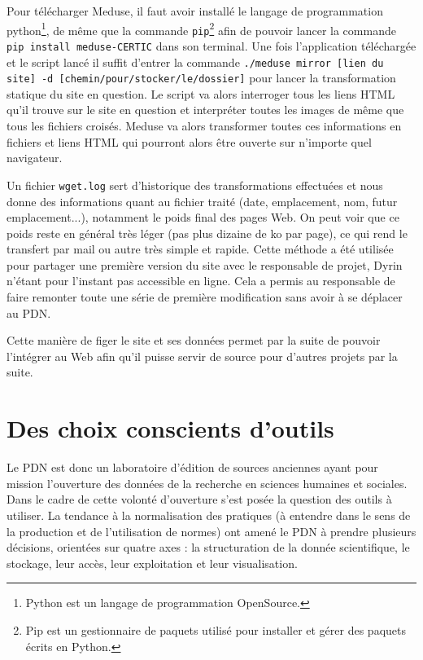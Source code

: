 \documentclass[a4paper,12pt,twoside]{book}
\begin{document}
Pour télécharger Meduse, il faut avoir installé le langage de programmation python\footnote{Python est un langage de programmation OpenSource.}, de même que la commande \texttt{pip}\footnote{Pip est un gestionnaire de paquets utilisé pour installer et gérer des paquets écrits en Python.} afin de pouvoir lancer la commande \texttt{pip install meduse-CERTIC} dans son terminal. Une fois l'application téléchargée et le script lancé il suffit d'entrer la commande \texttt{./meduse mirror [lien du site] -d [chemin/pour/stocker/le/dossier]}  pour lancer la transformation statique du site en question. Le script va alors interroger tous les liens \acrshort{HTML} qu'il trouve sur le site en question et interpréter toutes les images de même que tous les fichiers croisés. Meduse va alors transformer toutes ces informations en fichiers et liens HTML qui pourront alors être ouverte sur n'importe quel navigateur.

Un fichier \texttt{wget.log} sert d'historique des transformations effectuées et nous donne des informations quant au fichier traité (date, emplacement, nom, futur emplacement...), notamment le poids final des pages Web. On peut voir que ce poids reste en général très léger (pas plus dizaine de ko par page), ce qui rend le transfert par mail ou autre très simple et rapide. Cette méthode a été utilisée pour partager une première version du site avec le responsable de projet, Dyrin n'étant pour l'instant pas accessible en ligne. Cela a permis au responsable de faire remonter toute une série de première modification sans avoir à se déplacer au \acrshort{PDN}.

Cette manière de figer le site et ses données permet par la suite de pouvoir l'intégrer au Web afin qu'il puisse servir de source pour d'autres projets par la suite.
   
   
    
    \chapter{Des choix conscients d'outils}
    Le \acrshort{PDN} est donc un laboratoire d'édition de sources anciennes ayant pour mission l'ouverture des données de la recherche en sciences humaines et sociales. Dans le cadre de cette volonté d'ouverture s'est posée la question des outils à utiliser. La tendance à la normalisation des pratiques (à entendre dans le sens de la production et de l'utilisation de normes) ont amené le \acrshort{PDN} à prendre plusieurs décisions, orientées sur quatre axes : la structuration de la donnée scientifique, le stockage, leur accès, leur exploitation et leur visualisation.
    
\end{document}
